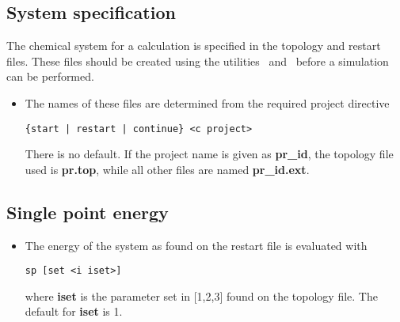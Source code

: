 \subsection{System specification}
The chemical system for a calculation is specified in the topology
and restart files. These files should be created using the utilities
\nwtop\ and \nwrst\ before a simulation can be performed.
\begin{itemize}
\item
The names of these files are determined from the required project directive
\begin{verbatim}
{start | restart | continue} <c project>
\end{verbatim}
There is no default. If the project name is given as {\bf pr\_id},
the topology file used is {\bf pr.top}, while all other files
are named {\bf pr\_id.ext}.
\end{itemize}
\subsection{Single point energy}
\begin{itemize}
\item
The energy of the system as found on the restart file is evaluated with
\begin{verbatim}
sp [set <i iset>]
\end{verbatim}
where {\bf iset} is the parameter set in [1,2,3] found on the
topology file. The default for {\bf iset} is 1.
\end{itemize}
